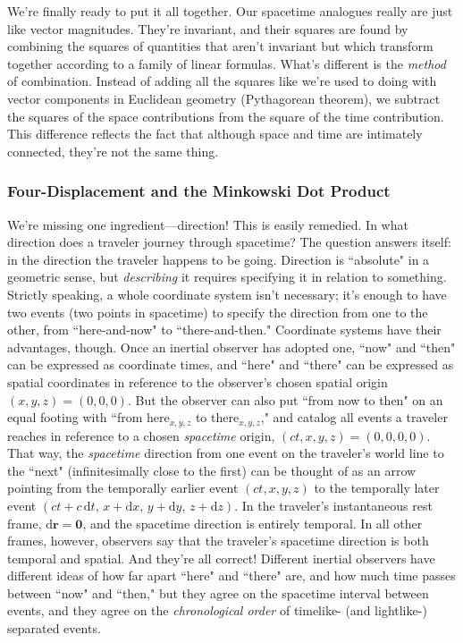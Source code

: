 \documentclass[12pt]{article}
\renewcommand{\vv}[1]{\mathbf{#1}}
\newcommand{\dd}[1]{\mathrm{d}#1}
\begin{document}
We're finally ready to put it all together. Our spacetime analogues really are just like vector magnitudes. They're invariant, and their squares are found by combining the squares of quantities that aren't invariant but which transform together according to a family of linear formulas. What's different is the \emph{method} of combination. Instead of adding all the squares like we're used to doing with vector components in Euclidean geometry (Pythagorean theorem), we subtract the squares of the space contributions from the square of the time contribution. This difference reflects the fact that although space and time are intimately connected, they're not the same thing.


\subsubsection{Four-Displacement and the Minkowski Dot Product}\label{sssec:fdi}

We're missing one ingredient---direction! This is easily remedied. In what direction does a traveler journey through spacetime? The question answers itself: in the direction the traveler happens to be going. Direction is ``absolute" in a geometric sense, but \emph{describing} it requires specifying it in relation to something. Strictly speaking, a whole coordinate system isn't necessary; it's enough to have two events (two points in spacetime) to specify the direction from one to the other, from ``here-and-now" to ``there-and-then." Coordinate systems have their advantages, though. Once an inertial observer has adopted one, ``now" and ``then" can be expressed as coordinate times, and ``here" and ``there" can be expressed as spatial coordinates in reference to the observer's chosen spatial origin $(x,y,z)=(0,0,0)$. But the observer can also put ``from now to then" on an equal footing with ``from here$_{x, y, z}$ to there$_{x, y, z}$," and catalog all events a traveler reaches in reference to a chosen \emph{spacetime} origin, $(ct,x,y,z)=(0,0,0,0)$. That way, the \emph{spacetime} direction from one event on the traveler's world line to the ``next" (infinitesimally close to the first) can be thought of as an arrow pointing from the temporally earlier event $(ct, x, y, z)$ to the temporally later event ${(ct + c \, \dd t, \, x + \dd x, \, y + \dd y, \, z + \dd z)}$. In the traveler's instantaneous rest frame, $\dd \vv r = \vv 0$, and the spacetime direction is entirely temporal. In all other frames, however, observers say that the traveler's spacetime direction is both temporal and spatial. And they're all correct! Different inertial observers have different ideas of how far apart ``here" and ``there" are, and how much time passes between ``now" and ``then," but they agree on the spacetime interval between events, and they agree on the \emph{chronological order} of timelike- (and lightlike-) separated events.
\end{document}

